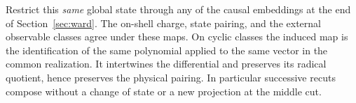 Restrict this \emph{same} global state through any of the causal embeddings at the end of Section~\ref{sec:ward}. The on-shell charge, state pairing, and the external observable classes agree under these maps. On cyclic classes the induced map is the identification of the same polynomial applied to the same vector in the common realization. It intertwines the differential and preserves its radical quotient, hence preserves the physical pairing. In particular successive recuts compose without a change of state or a new projection at the middle cut.

